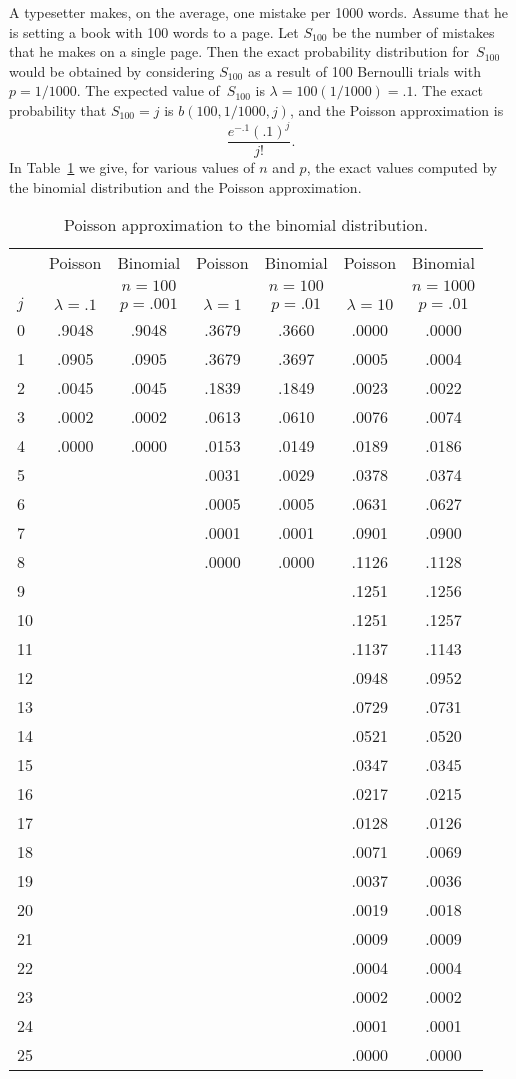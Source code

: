 \begin{example}\label{exam 5.3} A typesetter makes, on the average, one
mistake per 1000 words.  Assume that he is setting a book with 100 words to a page.  Let
$S_{100}$ be the number of mistakes that he makes on a single page.  Then the exact probability
distribution for~$S_{100}$ would be obtained by considering $S_{100}$ as a result of
100 Bernoulli trials with $p = 1/1000$.  The expected value of~$S_{100}$ is $\lambda =
100(1/1000) = .1$.  The exact probability that $S_{100} = j$ is
$b(100,1/1000,j)$, and the Poisson approximation is
$$
\frac {e^{-.1}(.1)^j}{j!}.
$$ In Table~\ref{table 5.1} we give, for various values of $n$ and $p$, the exact values computed
by the binomial distribution and the Poisson approximation.
\begin{table}
\centering
\begin{tabular}{|l|c|c|c|c|c|c|}
\hline
&Poisson&Binomial&Poisson&Binomial&Poisson&Binomial \\
&&$n = 100$&&$n = 100$&&$n = 1000$\\
$j$&$\lambda = .1$&$p = .001$&$\lambda = 1$&$p = .01$&$\lambda = 10$&$p = .01$\\
\hline
0&.9048&.9048&.3679&.3660&.0000&.0000\\
1&.0905&.0905&.3679&.3697&.0005&.0004\\
2&.0045&.0045&.1839&.1849&.0023&.0022\\
3&.0002&.0002&.0613&.0610&.0076&.0074\\
4&.0000&.0000&.0153&.0149&.0189&.0186\\
5&&&.0031&.0029&.0378&.0374\\
6&&&.0005&.0005&.0631&.0627\\
7&&&.0001&.0001&.0901&.0900\\
8&&&.0000&.0000&.1126&.1128\\
9&&&&&.1251&.1256\\
10&&&&&.1251&.1257\\
11&&&&&.1137&.1143\\
12&&&&&.0948&.0952\\
13&&&&&.0729&.0731\\
14&&&&&.0521&.0520\\
15&&&&&.0347&.0345\\
16&&&&&.0217&.0215\\
17&&&&&.0128&.0126\\
18&&&&&.0071&.0069\\
19&&&&&.0037&.0036\\
20&&&&&.0019&.0018\\
21&&&&&.0009&.0009\\
22&&&&&.0004&.0004\\
23&&&&&.0002&.0002\\
24&&&&&.0001&.0001\\
25&&&&&.0000&.0000\\
\hline
\end{tabular}
\caption{Poisson approximation to the binomial distribution.}
\label{table 5.1}
\end{table}
\end{example}

